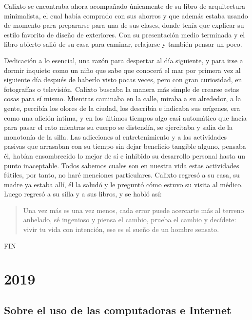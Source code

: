 \documentclass[12pt]{article}
\begin{document}
	Calixto se encontraba ahora acompañado únicamente de su libro de
	arquitectura minimalista, el cual había comprado con sus ahorros y que
	además estaba usando de momento para prepararse para una de sus
	clases, donde tenía que explicar su estilo favorito de diseño de
	exteriores. Con su presentación medio terminada y el libro abierto
	salió de su casa para caminar, relajarse y también pensar un poco.

	Dedicación a lo esencial, una razón para despertar al día siguiente, y
	para irse a dormir inquieto como un niño que sabe que conocerá el mar
	por primera vez al siguiente día después de haberlo visto pocas veces,
	pero con gran curiosidad, en fotografías o televisión. Calixto buscaba
	la manera más simple de crearse estas cosas para sí mismo. Mientras
	caminaba en la calle, miraba a su alrededor, a la gente, percibía los
	olores de la ciudad, los describía e indicaba sus orígenes, era como una
	afición intima, y en los últimos tiempos algo casi automático que hacía
	para pasar el rato mientras su cuerpo se distendía, se ejercitaba y
	salia de la monotonía de la silla. Las adicciones al entretenimiento
	y a las actividades pasivas que arrasaban con su tiempo sin dejar
	beneficio tangible alguno, pensaba él, habían ensombrecido lo mejor
	de sí e inhibido su desarrollo personal hasta un punto inaceptable.
	Todos sabemos cuales son en nuestra vida estas actividades fútiles,
	por tanto, no haré menciones particulares. Calixto regresó a su casa,
	su madre ya estaba allí, él la saludó y le preguntó cómo estuvo su
	visita al médico. Luego regresó a su silla y a sus libros, y se habló
	así:

	\blockquote[]
	{Una vez más es una vez menos, cada error puede acercarte más al
	terreno anhelado, sé ingenioso y piensa el cambio, prueba el cambio y
	decídete: vivir tu vida con intención, ese es el sueño de un hombre
	sensato.}

	\begin{center}FIN\end{center}

	\newpage

	\section{2019}

	\subsection{Sobre el uso de las computadoras e Internet}
\end{document}
